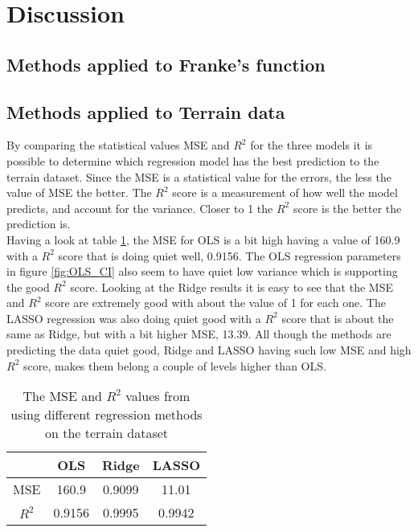 \documentclass[../main.tex]{subfiles}
\begin{document}
\section{Discussion}\label{sec:discussion}
\subsection{Methods applied to Franke's function}

\subsection{Methods applied to Terrain data}
By comparing the statistical values MSE and $R^2$ for the three models it is possible to determine which regression model has the best prediction to the terrain dataset. Since the MSE is a statistical value for the errors, the less the value of MSE the better. The $R^2$ score is a measurement of how well the model predicts, and account for the variance. Closer to 1 the $R^2$ score is the better the prediction is.\\

Having a look at table \ref{tab:statistical_results}, the MSE for OLS is a bit high having a value of 160.9 with a $R^2$ score that is doing quiet well, 0.9156. The OLS regression parameters in figure \ref{fig:OLS_CI} also seem to have quiet low variance which is supporting the good $R^2$ score. Looking at the Ridge results it is easy to see that the MSE and $R^2$ score are extremely good with about the value of 1 for each one. The LASSO regression was also doing quiet good with a $R^2$ score that is about the same as Ridge, but with a bit higher MSE, 13.39.  All though the methods are predicting the data quiet good, Ridge and LASSO having such low MSE and high $R^2$ score, makes them belong a couple of levels higher than OLS.

\begin{table}[H]
\begin{center}
\begin{tabular}{ |c|c|c|c| } 
 \hline
  & OLS & Ridge & LASSO \\ 
 \hline
 MSE & 160.9 & 0.9099 & 11.01\\
 \hline
 $R^2$ & 0.9156 & 0.9995 & 0.9942 \\ 
 \hline
\end{tabular}
\label{tab:statistical_results}
\caption{The MSE and $R^2$ values from using different regression methods on the terrain dataset}
\end{center}
\end{table}
\end{document}
